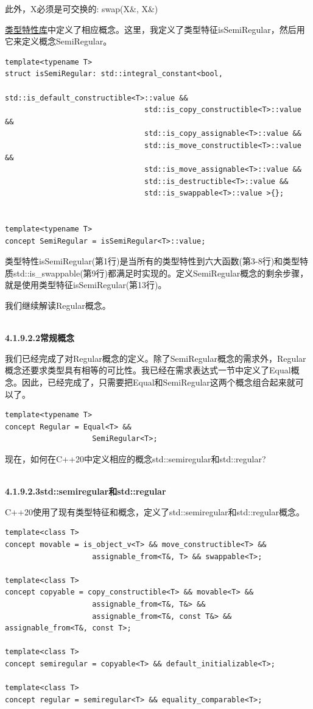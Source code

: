 此外，X必须是可交换的: swap(X\&, X\&)

\href{https://en.cppreference.com/w/cpp/header/type_traits}{类型特性库}中定义了相应概念。这里，我定义了类型特征isSemiRegular，然后用它来定义概念SemiRegular。

\begin{lstlisting}[style=styleCXX]
template<typename T>
struct isSemiRegular: std::integral_constant<bool,
								std::is_default_constructible<T>::value &&
								std::is_copy_constructible<T>::value &&
								std::is_copy_assignable<T>::value &&
								std::is_move_constructible<T>::value &&
								std::is_move_assignable<T>::value &&
								std::is_destructible<T>::value &&
								std::is_swappable<T>::value >{};


template<typename T>
concept SemiRegular = isSemiRegular<T>::value;
\end{lstlisting}

类型特性isSemiRegular(第1行)是当所有的类型特性到六大函数(第3-8行)和类型特质std::is\_swappable(第9行)都满足时实现的。定义SemiRegular概念的剩余步骤，就是使用类型特征isSemiRegular(第13行)。

我们继续解读Regular概念。

\hspace*{\fill} \\ %
\noindent
\textbf{4.1.9.2.2\hspace{0.2cm}常规概念}

我们已经完成了对Regular概念的定义。除了SemiRegular概念的需求外，Regular概念还要求类型具有相等的可比性。我已经在需求表达式一节中定义了Equal概念。因此，已经完成了，只需要把Equal和SemiRegular这两个概念组合起来就可以了。

\begin{lstlisting}[style=styleCXX]
template<typename T>
concept Regular = Equal<T> &&
					SemiRegular<T>;
\end{lstlisting}

现在，如何在C++20中定义相应的概念std::semiregular和std::regular?

\hspace*{\fill} \\ %
\noindent
\textbf{4.1.9.2.3\hspace{0.2cm}std::semiregular和std::regular}

C++20使用了现有类型特征和概念，定义了std::semiregular和std::regular概念。

\begin{lstlisting}[style=styleCXX]
template<class T>
concept movable = is_object_v<T> && move_constructible<T> &&
					assignable_from<T&, T> && swappable<T>;

template<class T>
concept copyable = copy_constructible<T> && movable<T> &&
					assignable_from<T&, T&> &&
					assignable_from<T&, const T&> && assignable_from<T&, const T>;

template<class T>
concept semiregular = copyable<T> && default_initializable<T>;

template<class T>
concept regular = semiregular<T> && equality_comparable<T>;
\end{lstlisting}

